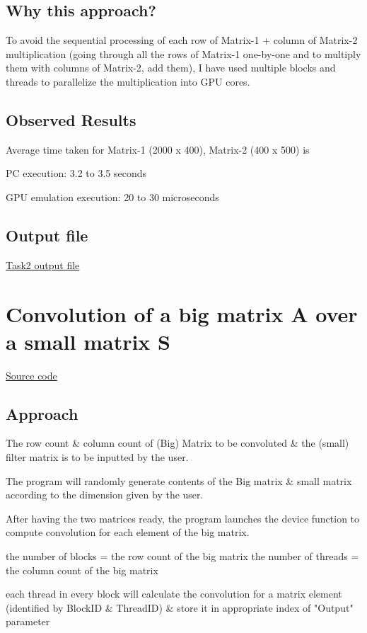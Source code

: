 \documentclass[]{article}
\begin{document}
	 \subsection{Why this approach?}
 
	 To avoid the sequential processing of each row of Matrix-1 + column of Matrix-2 multiplication (going through all the rows of Matrix-1 one-by-one and to multiply them with columns of Matrix-2, add them), I have used multiple blocks and threads to parallelize the multiplication into GPU cores.
 
	 \subsection{Observed Results}
 
     Average time taken for Matrix-1 (2000 x 400), Matrix-2 (400 x 500) is
     
     \begin{list}{*}{}
     	\item PC execution:  3.2 to 3.5 seconds
     	\item GPU emulation execution: 20 to 30 microseconds
     \end{list} 
     
	\subsection{Output file}
    \href{./Task2_data.txt}{Task2 output file}
    
  \newpage
 \section{Convolution of a big matrix A over a small matrix S}
 
  \href{./MatrixConvolution.cu}{Source code}
  
 \subsection{Approach}
 
 \begin{list}{*}{}
 	\item The row count \& column count of (Big) Matrix to be convoluted \& the (small) filter matrix is to be inputted by the user.
 	\item The program will randomly generate contents of the Big matrix \& small matrix according to the dimension given by the user.
 	\item After having the two matrices ready, the program launches the device function to compute convolution for each element of the big matrix.
 	\item the number of blocks = the row count of the big matrix \newline
	 	 the number of threads = the column count of the big matrix
	\item each thread in every block will calculate the convolution for a matrix element (identified by BlockID \& ThreadID) \& store it in appropriate index of "Output" parameter
 \end{list}
 
\end{document}
